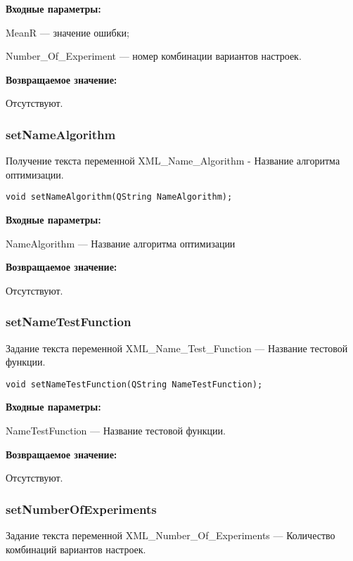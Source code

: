 \documentclass[a4paper,12pt]{article}
\begin{document}
\textbf{Входные параметры:}

MeanR --- значение ошибки;
 
    Number\_Of\_Experiment --- номер комбинации вариантов настроек.

\textbf{Возвращаемое значение:}

Отсутствуют.


\subsubsection{setNameAlgorithm}\label{setNameAlgorithm}

Получение текста переменной  XML\_Name\_Algorithm - Название алгоритма оптимизации.


\begin{lstlisting}[label=code_syntax_setNameAlgorithm,caption=Синтаксис]
void setNameAlgorithm(QString NameAlgorithm);
\end{lstlisting}

\textbf{Входные параметры:}

NameAlgorithm --- Название алгоритма оптимизации

\textbf{Возвращаемое значение:}

Отсутствуют.


\subsubsection{setNameTestFunction}\label{setNameTestFunction}

Задание текста переменной  XML\_Name\_Test\_Function --- Название тестовой функции.


\begin{lstlisting}[label=code_syntax_setNameTestFunction,caption=Синтаксис]
void setNameTestFunction(QString NameTestFunction);
\end{lstlisting}

\textbf{Входные параметры:}

NameTestFunction --- Название тестовой функции.

\textbf{Возвращаемое значение:}

Отсутствуют.


\subsubsection{setNumberOfExperiments}\label{setNumberOfExperiments}

Задание текста переменной  XML\_Number\_Of\_Experiments --- Количество комбинаций вариантов настроек.
\end{document}

